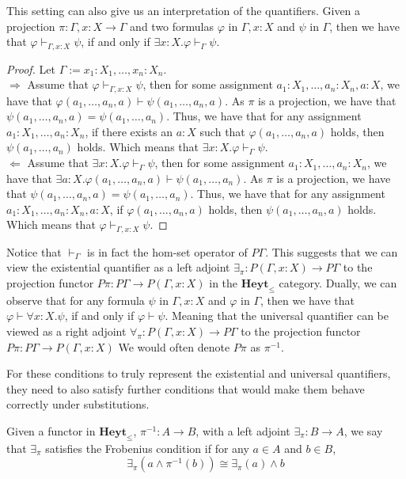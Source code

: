 This setting can also give us an interpretation of the quantifiers.
Given a projection $\pi:\Gamma,x:X\to\Gamma$
and two formulas $\varphi$ in $\Gamma,x:X$
and $\psi$ in $\Gamma$, then we have that
$\varphi\vdash_{\Gamma,x:X}\psi$,
if and only if $\exists x:X.\varphi\vdash_{\Gamma}\psi$.
\begin{proof}
    Let $\Gamma:=x_1:X_1,\dots,x_n:X_n$.
    \\
    $\Rightarrow$ Assume that $\varphi\vdash_{\Gamma,x:X}\psi$,
    then for some assignment $a_1:X_1,\dots,a_n:X_n,a:X$,
    we have that $\varphi(a_1,\dots,a_n,a)\vdash \psi(a_1,\dots,a_n,a)$.
    As $\pi$ is a projection, we have that
    $\psi(a_1,\dots,a_n,a)=\psi(a_1,\dots,a_n)$.
    Thus, we have that for any assignment $a_1:X_1,\dots,a_n:X_n$,
    if there exists an $a:X$ such that $\varphi(a_1,\dots,a_n,a)$ holds,
    then $\psi(a_1,\dots,a_n)$ holds. Which means that $\exists x:X.\varphi\vdash_{\Gamma}\psi$.
    \\
    $\Leftarrow$ Assume that $\exists x:X.\varphi\vdash_{\Gamma}\psi$,
    then for some assignment $a_1:X_1,\dots,a_n:X_n$,
    we have that $\exists a:X.\varphi(a_1,\dots,a_n,a)\vdash \psi(a_1,\dots,a_n)$.
    As $\pi$ is a projection, we have that
    $\psi(a_1,\dots,a_n,a)=\psi(a_1,\dots,a_n)$.
    Thus, we have that for any assignment $a_1:X_1,\dots,a_n:X_n,a:X$,
    if $\varphi(a_1,\dots,a_n,a)$ holds,
    then $\psi(a_1,\dots,a_n,a)$ holds. Which means that $\varphi\vdash_{\Gamma,x:X}\psi$.
\end{proof}
Notice that $\vdash_\Gamma$ is in fact the hom-set operator of $P\Gamma$.
This suggests that we can view the existential quantifier as a 
left adjoint $\exists_\pi:P(\Gamma,x:X)\to P\Gamma$
to the projection functor $P\pi:P\Gamma\to P(\Gamma,x:X)$
in the $\mathbf{Heyt}_{\leq}$ category.
Dually, we can observe that for any formula $\psi$ in $\Gamma,x:X$
and $\varphi$ in $\Gamma$, then we have that
 $\varphi\vdash\forall x:X.\psi$,
if and only if $\varphi\vdash\psi$.
Meaning that the universal quantifier can be viewed as a
right adjoint $\forall_\pi:P(\Gamma,x:X)\to P\Gamma$
to the projection functor $P\pi:P\Gamma\to P(\Gamma,x:X)$
We would often denote $P\pi$ as $\pi^{-1}$.

For these conditions to truly represent 
the existential and universal quantifiers,
they need to also satisfy further conditions
that would make them behave correctly under
substitutions.

\begin{definition}
    Given a functor in $\mathbf{Heyt}_{\leq}$, $\pi^{-1}:A\to B$,
    with a left adjoint $\exists_\pi:B\to A$,
    we say that $\exists_\pi$ satisfies the Frobenius condition
    if for any $a\in A$ and $b\in B$,
    \[
        \exists_\pi(a\wedge \pi^{-1}(b))\cong\exists_\pi(a)\wedge b
    \]
\end{definition}

